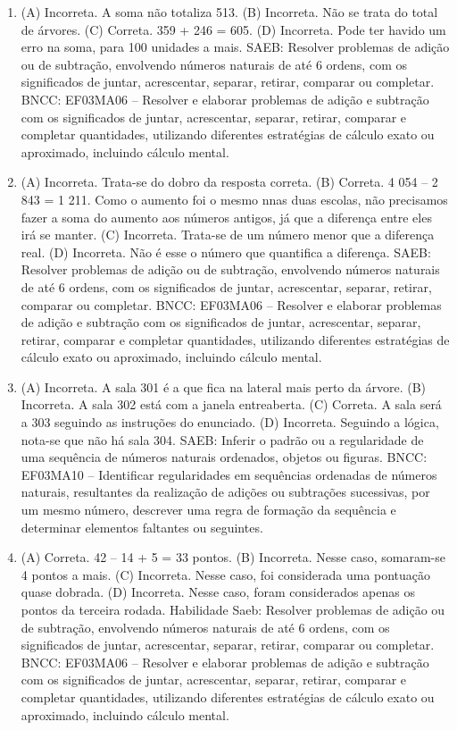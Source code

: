 \begin{enumerate}
\item
(A) Incorreta. A soma não totaliza 513.
(B) Incorreta. Não se trata do total de árvores.
(C) Correta. 359 + 246 = 605.
(D) Incorreta. Pode ter havido um erro na soma, para 100 unidades a mais.
SAEB: Resolver problemas de adição ou de subtração,
envolvendo números naturais de até 6 ordens, com os significados de
juntar, acrescentar, separar, retirar, comparar ou completar.
BNCC: EF03MA06 – Resolver e elaborar problemas de adição e subtração com os significados de
juntar, acrescentar, separar, retirar, comparar e completar quantidades, utilizando diferentes
estratégias de cálculo exato ou aproximado, incluindo cálculo mental.

\item
(A) Incorreta. Trata-se do dobro da resposta correta.
(B) Correta. 4 054 -- 2 843 = 1 211. Como o aumento foi o mesmo nnas duas escolas, não
precisamos fazer a soma do aumento aos números antigos, já que a diferença entre eles irá se manter.
(C) Incorreta. Trata-se de um número menor que a diferença real.
(D) Incorreta. Não é esse o número que quantifica a diferença.
SAEB: Resolver problemas de adição ou de subtração,
envolvendo números naturais de até 6 ordens, com os significados de
juntar, acrescentar, separar, retirar, comparar ou completar.
BNCC: EF03MA06 – Resolver e elaborar problemas de adição e subtração com os significados de
juntar, acrescentar, separar, retirar, comparar e completar quantidades, utilizando diferentes
estratégias de cálculo exato ou aproximado, incluindo cálculo mental.

\item
(A) Incorreta. A sala 301 é a que fica na lateral mais perto da árvore.
(B) Incorreta. A sala 302 está com a janela entreaberta.
(C) Correta. A sala será a 303 seguindo as instruções do enunciado.
(D) Incorreta. Seguindo a lógica, nota-se que não há sala 304.
SAEB: Inferir o padrão ou a regularidade de uma sequência de
números naturais ordenados, objetos ou figuras.
BNCC: EF03MA10 -- Identificar regularidades em sequências ordenadas de números naturais,
resultantes da realização de adições ou subtrações sucessivas, por um mesmo número,
descrever uma regra de formação da sequência e determinar elementos faltantes ou seguintes.

\item
(A) Correta. 42 -- 14 + 5 = 33 pontos.
(B) Incorreta. Nesse caso, somaram-se 4 pontos a mais.
(C) Incorreta. Nesse caso, foi considerada uma pontuação quase dobrada.
(D) Incorreta. Nesse caso, foram considerados apenas os pontos da terceira rodada.
Habilidade Saeb: Resolver problemas de adição ou de subtração,
envolvendo números naturais de até 6 ordens, com os significados de
juntar, acrescentar, separar, retirar, comparar ou completar.
BNCC: EF03MA06 – Resolver e elaborar problemas de adição e subtração com os significados de
juntar, acrescentar, separar, retirar, comparar e completar quantidades, utilizando diferentes
estratégias de cálculo exato ou aproximado, incluindo cálculo mental.


\end{enumerate}
